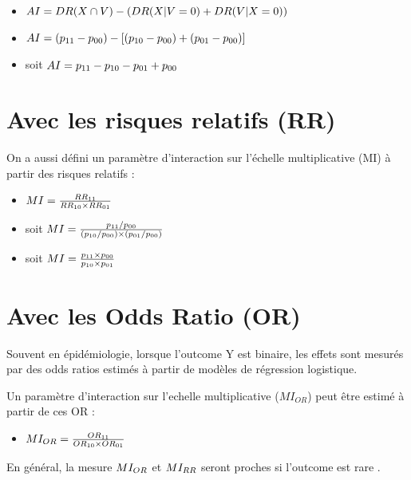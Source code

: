 \documentclass[
]{book}
\providecommand{\tightlist}{%
  \setlength{\itemsep}{0pt}\setlength{\parskip}{0pt}}
\begin{document}
\begin{itemize}
\tightlist
\item
  \(\small AI = DR(X\cap V) - (DR(X|V=0) + DR(V|X=0))\)
\item
  \(\small AI = (p_{11} - p_{00}) - [(p_{10} - p_{00}) + (p_{01} - p_{00})]\)
\item
  soit \(\small AI =p_{11} - p_{10} - p_{01} + p_{00}\)
\end{itemize}

\hypertarget{avec-les-risques-relatifs-rr}{%
\section{Avec les risques relatifs (RR)}\label{avec-les-risques-relatifs-rr}}

On a aussi défini un paramètre d'interaction sur l'échelle multiplicative (MI) à partir des risques relatifs \citet{vanderweele_tutorial_2014} :

\begin{itemize}
\tightlist
\item
  \(\small MI = \frac{RR_{11}}{RR_{10} \times RR_{01}}\)
\item
  soit \(\small MI = \frac{p_{11} / p_{00}}{(p_{10} / p_{00}) \times (p_{01} / p_{00})}\)
\item
  soit \(\small MI = \frac{p_{11} \times p_{00}}{p_{10} \times p_{01}}\)
\end{itemize}

\hypertarget{avec-les-odds-ratio-or}{%
\section{Avec les Odds Ratio (OR)}\label{avec-les-odds-ratio-or}}

Souvent en épidémiologie, lorsque l'outcome Y est binaire, les effets sont mesurés par des odds ratios estimés à partir de modèles de régression logistique.

Un paramètre d'interaction sur l'echelle multiplicative (\(MI_{OR}\)) peut être estimé à partir de ces OR \citet{vanderweele_tutorial_2014} :

\begin{itemize}
\tightlist
\item
  \(\small MI_{OR} = \frac{OR_{11}}{OR_{10} \times OR_{01}}\)
\end{itemize}

En général, la mesure \(\small MI_{OR}\) et \(\small MI_{RR}\) seront proches si l'outcome est rare \citet{vanderweele_tutorial_2014}.
\end{document}
